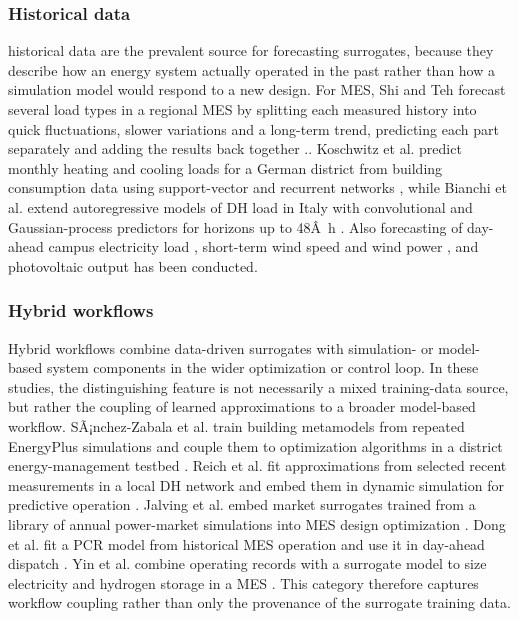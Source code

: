 \subsubsection{Historical data}

historical data are the prevalent source for forecasting surrogates,
because they describe how an energy system actually operated in the past
rather than how a simulation model would respond to a new design. For
MES, Shi and Teh forecast several load types in a regional MES by
splitting each measured history into quick fluctuations, slower
variations and a long-term trend, predicting each part separately and
adding the results back together \cite{Shi2024__2}.\cite{Dong2024}. Koschwitz et
al. predict monthly heating and cooling loads for a German district from
building consumption data using support-vector and recurrent networks
\cite{Koschwitz2018134}, while Bianchi et al. extend autoregressive models
of DH load in Italy with convolutional and Gaussian-process predictors
for horizons up to 48Â~h \cite{Bianchi2020244}. Also forecasting of day-ahead
campus electricity load \cite{Madhukumar20228891}, short-term wind speed and
wind power \cite{Tian2020,Hanifi2024}, and photovoltaic output \cite{Li2019}
has been conducted.

\subsubsection{Hybrid workflows}

Hybrid workflows combine data-driven surrogates with simulation- or
model-based system components in the wider optimization or control
loop. In these studies, the distinguishing feature is not necessarily a
mixed training-data source, but rather the coupling of learned
approximations to a broader model-based workflow. SÃ¡nchez-Zabala et
al. train building metamodels from repeated EnergyPlus simulations and
couple them to optimization algorithms in a district energy-management
testbed \cite{Sánchez-Zabala2024}. Reich et al. fit approximations from selected
recent measurements in a local DH network and embed them in dynamic
simulation for predictive operation \cite{Reich2020}. Jalving et al. embed
market surrogates trained from a library of annual power-market
simulations into MES design optimization \cite{Jalving2023}. Dong et al.
fit a PCR model from historical MES operation and use it in day-ahead
dispatch \cite{Dong2023}. Yin et al. combine operating records with a
surrogate model to size electricity and hydrogen storage in a MES
\cite{Yin2024}. This category therefore captures workflow coupling rather
than only the provenance of the surrogate training data.

